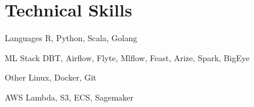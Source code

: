 \documentclass{tccv}
\begin{document}
\section{Technical Skills}
\begin{factlist}
\item{Languages}
  {R, Python, Scala, Golang}
\item{ML Stack}
  {DBT, Airflow, Flyte, Mlflow, Feast, Arize, Spark, BigEye}
\item{Other}
  {Linux, Docker, Git}
\item{AWS}
  {Lambda, S3, ECS, Sagemaker}
\end{factlist}












\end{document}
